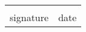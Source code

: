 \documentclass[12pt]{exam}
\begin{document}
    \begin{center}
    \begin{center}
        \def\arraystretch{0.35}%
        \begin{tabular}{ b{8cm} b{8cm} }
        \vspace{.5cm} \underline{\hspace{7cm}} & \vspace{.5cm} \underline{\hspace{4.5cm}}  \tabularnewline
        \vspace{6pt} signature & \vspace{6pt} date    
        \end{tabular}
    \end{center}
    \end{center}    
\end{document}
